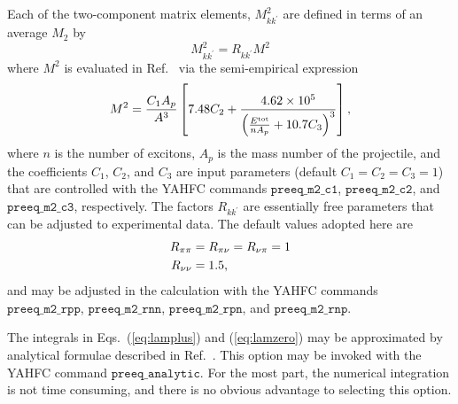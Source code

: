 \documentclass[
10pt,
showpacs,preprintnumbers,footinbib,
amsfonts,amsmath,amssymb,
aps,
prc,twocolumn,groupedaddress,superscriptaddress,
showkeys,
nofootinbib
]{revtex4-1}
\begin{document}
\begin{widetext}
Each of the two-component matrix elements, $M_{kk^\prime}^2$ are defined in terms of an average $M_2$ by
\begin{equation}
M_{kk^\prime}^2 = R_{kk^\prime} M^2
\end{equation}
where $M^2$ is evaluated in Ref.~\cite{TALYS} via the semi-empirical expression
\begin{equation}
M^2 = \frac{C_1A_p}{A^3}\left [ 7.48 C_2 + \frac{4.62\times 10^5}{\left ( \frac{E^{\rm tot}}{nA_p} + 10.7 C_3 \right )^3} \right ],
\end{equation}
where $n$ is the number of excitons, $A_p$ is the mass number of the projectile, and the coefficients $C_1$, $C_2$, and $C_3$
are input parameters (default $C_1 = C_2 = C_3 = 1$) that are controlled with the YAHFC commands ${\texttt{preeq\_m2\_c1}}$,
${\texttt{preeq\_m2\_c2}}$, and ${\texttt{preeq\_m2\_c3}}$, respectively. The factors $R_{kk^\prime}$ are essentially free parameters that can be adjusted to
experimental data. The default values adopted here are~\cite{Koning:2004}
\begin{align}
R_{\pi\pi} &= R_{\pi\nu} = R_{\nu\pi} = 1 \notag \\
R_{\nu\nu} &= 1.5,
\end{align}
and may be adjusted in the calculation with the YAHFC commands ${\texttt{preeq\_m2\_rpp}}$, ${\texttt{preeq\_m2\_rnn}}$, ${\texttt{preeq\_m2\_rpn}}$, and
${\texttt{preeq\_m2\_rnp}}$.

The integrals in Eqs.~(\ref{eq:lamplus}) and (\ref{eq:lamzero}) may be approximated by analytical formulae described in Ref.~\cite{Kalbach:1985}. This option may be invoked with the YAHFC command ${\texttt{preeq\_analytic}}$. For the most part, the numerical integration is
not time consuming, and there is no obvious advantage to selecting this option.


\end{widetext}
\end{document}
